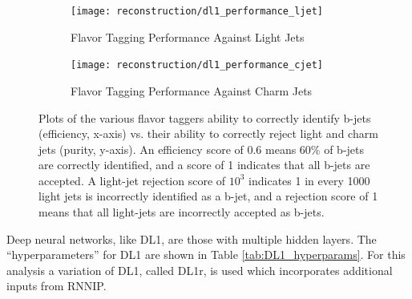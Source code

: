             \begin{figure}
                \begin{subfigure}{0.48\textwidth}
                    \texttt{[image: reconstruction/dl1\_performance\_ljet]}
                    \captionsetup{justification=centering} \caption{Flavor Tagging Performance Against Light Jets}
                \end{subfigure}
                \begin{subfigure}{0.48\textwidth}
                    \texttt{[image: reconstruction/dl1\_performance\_cjet]}
                    \captionsetup{justification=centering} \caption{Flavor Tagging Performance Against Charm Jets}
                \end{subfigure}
                \caption{
                    Plots of the various flavor taggers ability to correctly identify b-jets (efficiency, x-axis)
                        vs. their ability to correctly reject light and charm jets (purity, y-axis).
                    An efficiency score of 0.6 means 60\% of b-jets are correctly identified,
                        and a score of 1 indicates that all b-jets are accepted.
                    A light-jet rejection score of $10^3$ indicates 1 in every 1000 light jets is incorrectly identified as a b-jet,
                        and a rejection score of 1 means that all light-jets are incorrectly accepted as b-jets\cite{bjet_id_and_performance}.
                }
                \label{fig:ip3d_perf}
            \end{figure}


            Deep neural networks, like DL1, are those with multiple hidden layers.
            The ``hyperparameters'' for DL1 are shown in Table \ref{tab:DL1_hyperparams}.
            For this analysis a variation of DL1, called DL1r, is used which incorporates additional inputs from RNNIP.
        
